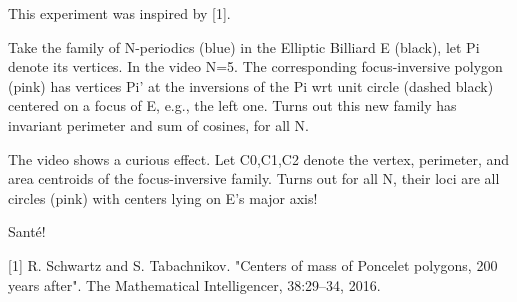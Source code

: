 This experiment was inspired by [1].

Take the family of N-periodics (blue) in the Elliptic Billiard E (black), let Pi denote its vertices. In the video N=5. The corresponding focus-inversive polygon (pink) has vertices Pi' at the inversions of the Pi wrt unit circle (dashed black) centered on a focus of E, e.g., the left one. Turns out this new family has invariant perimeter and sum of cosines, for all N.

The video shows a curious effect. Let C0,C1,C2 denote the vertex, perimeter, and area centroids of the focus-inversive family. Turns out for all N, their loci are all circles (pink) with centers lying on E's major axis!

Santé!

[1] R. Schwartz and S. Tabachnikov. "Centers of mass of Poncelet polygons, 200 years after". The Mathematical Intelligencer, 38:29–34, 2016.
